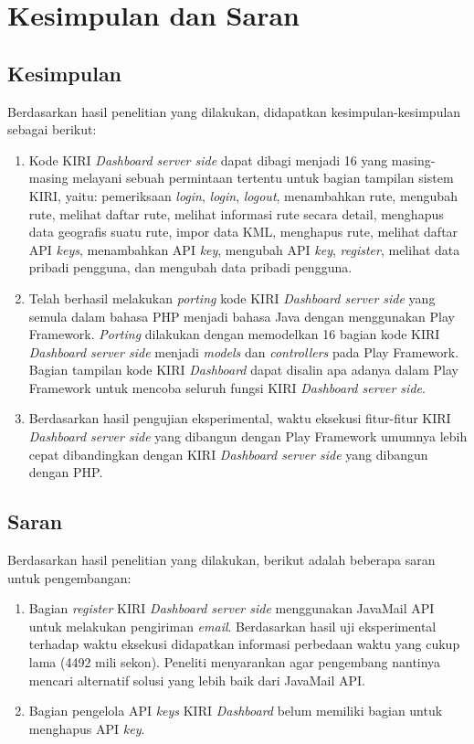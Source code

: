 \chapter{Kesimpulan dan Saran}
\label{chap:kesimpulansaran}

\section{Kesimpulan}
\label{sec:kesimpulan}
Berdasarkan hasil penelitian yang dilakukan, didapatkan kesimpulan-kesimpulan sebagai berikut:
\begin{enumerate}
	\item Kode KIRI \textit{Dashboard server side} dapat dibagi menjadi 16 yang masing-masing melayani sebuah permintaan tertentu untuk bagian tampilan sistem KIRI, yaitu: pemeriksaan \textit{login}, \textit{login}, \textit{logout}, menambahkan rute, mengubah rute, melihat daftar rute, melihat informasi rute secara detail, menghapus data geografis suatu rute, impor data KML, menghapus rute, melihat daftar API \textit{keys}, menambahkan API \textit{key}, mengubah API \textit{key}, \textit{register}, melihat data pribadi pengguna, dan mengubah data pribadi pengguna.
	\item Telah berhasil melakukan \textit{porting} kode KIRI \textit{Dashboard server side} yang semula dalam bahasa PHP menjadi bahasa Java dengan menggunakan Play Framework. \textit{Porting} dilakukan dengan memodelkan 16 bagian kode KIRI \textit{Dashboard server side} menjadi \textit{models} dan \textit{controllers} pada Play Framework. Bagian tampilan kode KIRI \textit{Dashboard} dapat disalin apa adanya dalam Play Framework untuk mencoba seluruh fungsi KIRI \textit{Dashboard server side}.
	\item Berdasarkan hasil pengujian eksperimental, waktu eksekusi fitur-fitur KIRI \textit{Dashboard server side} yang dibangun dengan Play Framework umumnya lebih cepat dibandingkan dengan KIRI \textit{Dashboard server side} yang dibangun dengan PHP.
\end{enumerate}

\section{Saran}
\label{sec:saran}
Berdasarkan hasil penelitian yang dilakukan, berikut adalah beberapa saran untuk pengembangan:
\begin{enumerate}
	\item Bagian \textit{register} KIRI \textit{Dashboard server side} menggunakan JavaMail API untuk melakukan pengiriman \textit{email}. Berdasarkan hasil uji eksperimental terhadap waktu eksekusi didapatkan informasi perbedaan waktu yang cukup lama (4492 mili sekon). Peneliti menyarankan agar pengembang nantinya mencari alternatif solusi yang lebih baik dari JavaMail API.
	\item Bagian pengelola API \textit{keys} KIRI \textit{Dashboard} belum memiliki bagian untuk menghapus API \textit{key}.
\end{enumerate}